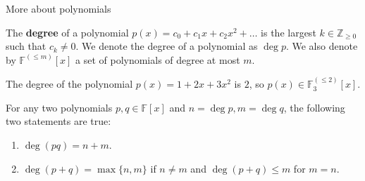 \documentclass{beamer}
\begin{document}
    \begin{frame}{More about polynomials}
      \begin{definition}
          The \textbf{degree} of a polynomial $p(x) = c_0+c_1x+c_2x^2+\dots$ is the largest $k \in \mathbb{Z}_{\geq 0}$ such that $c_k \neq 0$. We denote the degree of a polynomial as $\deg p$. We also denote by $\mathbb{F}^{(\leq m)}[x]$ a set of polynomials of degree at most $m$.
      \end{definition}
      \pause
      
      \begin{example}
          The degree of the polynomial $p(x) = 1 + 2x + 3x^2$ is $2$, so $p(x) \in \mathbb{F}_3^{(\leq 2)}[x]$.
      \end{example}
      \pause

      \begin{theorem}
          For any two polynomials $p,q \in \mathbb{F}[x]$ and $n = \deg p, m = \deg q$, the following two statements are true:
          \begin{enumerate}
              \item $\deg (pq) = n + m$.
              \item $\deg (p + q) = \max\{n,m\}$ if $n \neq m$ and $\deg (p+q) \leq m$ for $m=n$.
          \end{enumerate}
      \end{theorem}
    \end{frame}
\end{document}
